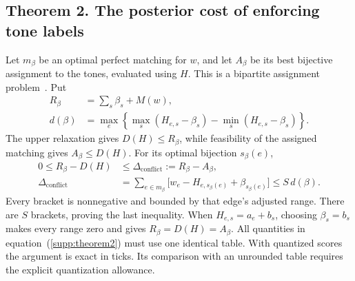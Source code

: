 \documentclass[10pt,letterpaper]{article}
\begin{document}
\subsection{Theorem 2. The posterior cost of enforcing tone labels}
Let $m_\beta$ be an optimal perfect matching for $w$, and let $A_\beta$ be its best bijective assignment to the tones, evaluated using $H$. This is a bipartite assignment problem~\cite{kuhn}. Put
\begin{equation}
 \begin{aligned}
 R_\beta&=\sum_s\beta_s+M(w),\\
 d(\beta)&=\max_e\left\{\max_s(H_{e,s}-\beta_s)
                         -\min_s(H_{e,s}-\beta_s)\right\}.
 \end{aligned}
 \label{supp:conflict-definitions}
\end{equation}
The upper relaxation gives $D(H)\le R_\beta$, while feasibility of the assigned matching gives $A_\beta\le D(H)$. For its optimal bijection $s_\beta(e)$,
\begin{equation}
 \begin{aligned}
 0\le R_\beta-D(H)&\le\Delta_{\mathrm{conflict}}:=R_\beta-A_\beta,\\
 \Delta_{\mathrm{conflict}}
 &=\sum_{e\in m_\beta}\bigl[w_e-H_{e,s_\beta(e)}+\beta_{s_\beta(e)}\bigr]
 \le S\,d(\beta).
 \end{aligned}
 \label{supp:theorem2}
\end{equation}
Every bracket is nonnegative and bounded by that edge's adjusted range. There are $S$ brackets, proving the last inequality. When $H_{e,s}=a_e+b_s$, choosing $\beta_s=b_s$ makes every range zero and gives $R_\beta=D(H)=A_\beta$. All quantities in equation~(\ref{supp:theorem2}) must use one identical table. With quantized scores the argument is exact in ticks. Its comparison with an unrounded table requires the explicit quantization allowance.
\end{document}
